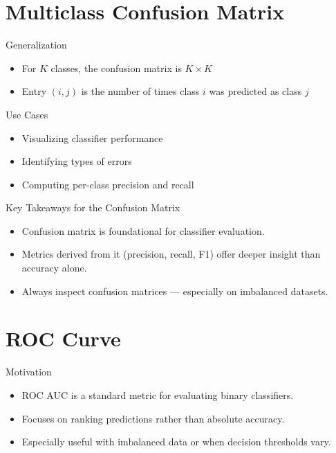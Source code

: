 \documentclass[aspectratio=169]{beamer}
\begin{document}
\section{Multiclass Confusion Matrix}
\label{sec:orgcdee63a}
\begin{frame}[label={sec:org69dcda3}]{Generalization}
\begin{itemize}
\item For \(K\) classes, the confusion matrix is \(K \times K\)
\item Entry \((i,j)\) is the number of times class \(i\) was predicted as class \(j\)
\end{itemize}
\end{frame}

\begin{frame}[label={sec:orgd5f1001}]{Use Cases}
\begin{itemize}
\item Visualizing classifier performance
\item Identifying types of errors
\item Computing per-class precision and recall
\end{itemize}
\end{frame}


\begin{frame}[label={sec:orge3fcd83}]{Key Takeaways for the Confusion Matrix}
\begin{itemize}
\item Confusion matrix is foundational for classifier evaluation.
\item Metrics derived from it (precision, recall, F1) offer deeper insight than accuracy alone.
\item Always inspect confusion matrices — especially on imbalanced datasets.
\end{itemize}
\end{frame}

\section{ROC Curve}
\label{sec:orge351a26}
\begin{frame}[label={sec:orgf6cd047}]{Motivation}
\begin{itemize}
\item ROC AUC is a standard metric for evaluating binary classifiers.
\item Focuses on ranking predictions rather than absolute accuracy.
\item Especially useful with imbalanced data or when decision thresholds vary.
\end{itemize}
\end{frame}
\end{document}
